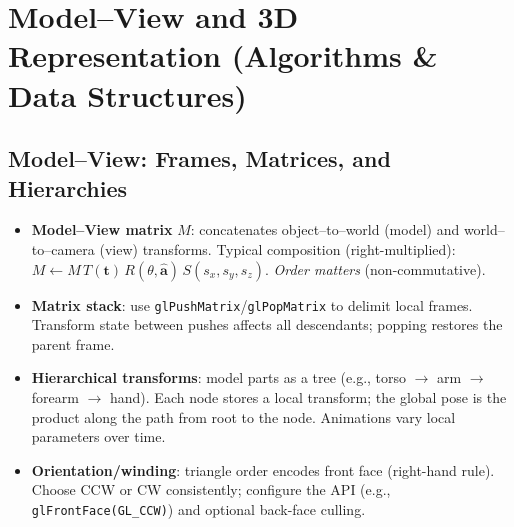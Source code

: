\documentclass[10pt,twocolumn]{extarticle}
\begin{document}
\section{Model--View and 3D Representation (Algorithms \& Data Structures)}

\subsection*{Model--View: Frames, Matrices, and Hierarchies}
\begin{itemize}
  \item \textbf{Model--View matrix} \(M\): concatenates object--to--world (model) and world--to--camera (view) transforms. Typical composition (right-multiplied): \(M \gets M\,T(\mathbf t)\,R(\theta,\hat{\mathbf a})\,S(s_x,s_y,s_z)\). \emph{Order matters} (non-commutative).
  \item \textbf{Matrix stack}: use \verb|glPushMatrix|/\verb|glPopMatrix| to delimit local frames. Transform state between pushes affects all descendants; popping restores the parent frame.
  \item \textbf{Hierarchical transforms}: model parts as a tree (e.g., torso \(\to\) arm \(\to\) forearm \(\to\) hand). Each node stores a local transform; the global pose is the product along the path from root to the node. Animations vary local parameters over time.
  \item \textbf{Orientation/winding}: triangle order encodes front face (right-hand rule). Choose CCW or CW consistently; configure the API (e.g., \verb|glFrontFace(GL_CCW)|) and optional back-face culling.
\end{itemize}
\end{document}
